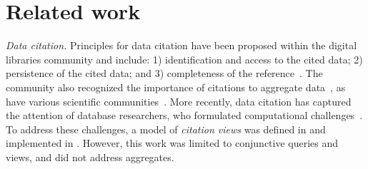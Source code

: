 \section{Related work}\label{Sec: related_work}

{\em Data citation.} Principles for data citation have been proposed within the digital libraries community\cite{CODATA2013,FORCE11_2104} 
and include: 1) identification and access to the cited data; 2) persistence of the cited data; and 3) completeness of the reference~\cite{Klump2015,Simons12,BraseSL15,DataCite2016}. 
The community also recognized the importance of citations to aggregate data~\cite{CODATA2013}, as have various scientific communities~\cite{harrow2012gencode, himmelstein2017systematic, mcentyre2015biostudies}. 
More recently, data citation has captured the attention of database researchers, who formulated computational challenges~\cite{BunemanEtAl2016, DBLP:conf/pods/DavidsonBDMS17}.
To address these challenges, a model of {\em citation views} was defined in \cite{davidson2017model} and implemented in \cite{alawini2017automating,wu2018data}.  However, this work was limited to conjunctive queries and views, and did not address aggregates. 


